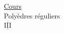 \begin{flushright}
\uline{Cours}\\
Polyèdres réguliers\\
$\overline{\underline{\mathrm{III}}}$
\end{flushright}

